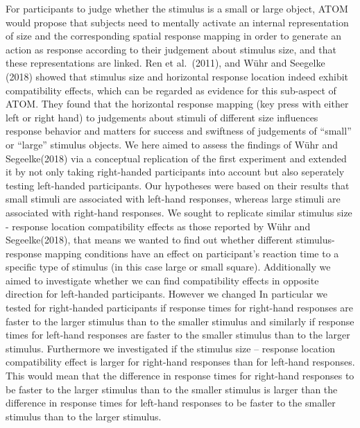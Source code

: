 \documentclass[
  english,
  man,floatsintext]{apa6}
\begin{document}
For participants to judge whether the stimulus is a small or large object, ATOM would propose that subjects need to mentally activate an internal representation of size and the corresponding spatial response mapping in order to generate an action as response according to their judgement about stimulus size, and that these representations are linked. Ren et al.~(2011), and Wühr and Seegelke (2018) showed that stimulus size and horizontal response location indeed exhibit compatibility effects, which can be regarded as evidence for this sub-aspect of ATOM. They found that the horizontal response mapping (key press with either left or right hand) to judgements about stimuli of different size influences response behavior and matters for success and swiftness of judgements of \enquote{small} or \enquote{large} stimulus objects.
We here aimed to assess the findings of Wühr and Segeelke(2018) via a conceptual replication of the first experiment and extended it by not only taking right-handed participants into account but also seperately testing left-handed participants. Our hypotheses were based on their results that small stimuli are associated with left-hand responses, whereas large stimuli are associated with right-hand responses. We sought to replicate similar stimulus size - response location compatibility effects as those reported by Wühr and Segeelke(2018), that means we wanted to find out whether different stimulus-response mapping conditions have an effect on participant's reaction time to a specific type of stimulus (in this case large or small square). Additionally we aimed to investigate whether we can find compatibility effects in opposite direction for left-handed participants. However we changed
In particular we tested for right-handed participants if response times for right-hand responses are faster to the larger stimulus than to the smaller stimulus and similarly if response times for left-hand responses are faster to the smaller stimulus than to the larger stimulus. Furthermore we investigated if the stimulus size -- response location compatibility effect is larger for right-hand responses than for left-hand responses. This would mean that the difference in response times for right-hand responses to be faster to the larger stimulus than to the smaller stimulus is larger than the difference in response times for left-hand responses to be faster to the smaller stimulus than to the larger stimulus.
\end{document}
